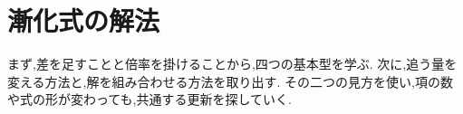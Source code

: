 
\chapter{漸化式の解法}\label{章：漸化式の解説}
\begin{bookcolumns}
まず,差を足すことと倍率を掛けることから,四つの基本型を学ぶ.
次に,追う量を変える方法と,解を組み合わせる方法を取り出す.
その二つの見方を使い,項の数や式の形が変わっても,共通する更新を探していく.










\end{bookcolumns}
